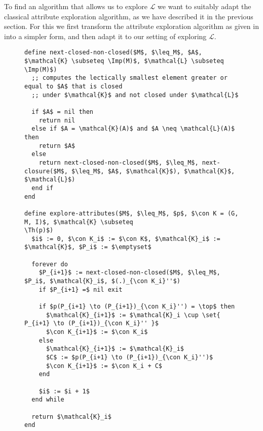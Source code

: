 To find an algorithm that allows us to explore $\mathcal{L}$ we want to suitably adapt the
classical attribute exploration algorithm, as we have described it in the previous
section.  For this we first transform the attribute exploration algorithm as given in
 into a simpler form, and then adapt it to our setting of
exploring $\mathcal{L}$.


\begin{figure}[tp]
  \begin{Algorithm}
  \label{alg:explore-attributes-with-next-closed-none-closed}
  \hspace*{0cm}
\begin{lstlisting}
define next-closed-non-closed($M$, $\leq_M$, $A$, $\mathcal{K} \subseteq \Imp(M)$, $\mathcal{L} \subseteq \Imp(M)$)
  ;; computes the lectically smallest element greater or equal to $A$ that is closed
  ;; under $\mathcal{K}$ and not closed under $\mathcal{L}$

  if $A$ = nil then
    return nil
  else if $A = \mathcal{K}(A)$ and $A \neq \mathcal{L}(A)$ then
    return $A$
  else
    return next-closed-non-closed($M$, $\leq_M$, next-closure($M$, $\leq_M$, $A$, $\mathcal{K}$), $\mathcal{K}$, $\mathcal{L}$)
  end if
end

define explore-attributes($M$, $\leq_M$, $p$, $\con K = (G, M, I)$, $\mathcal{K} \subseteq
\Th(p)$)
  $i$ := 0, $\con K_i$ := $\con K$, $\mathcal{K}_i$ := $\mathcal{K}$, $P_i$ := $\emptyset$

  forever do
    $P_{i+1}$ := next-closed-non-closed($M$, $\leq_M$, $P_i$, $\mathcal{K}_i$, $(.)_{\con K_i}''$)
    if $P_{i+1} =$ nil exit

    if $p(P_{i+1} \to (P_{i+1})_{\con K_i}'') = \top$ then
      $\mathcal{K}_{i+1}$ := $\mathcal{K}_i \cup \set{ P_{i+1} \to (P_{i+1})_{\con K_i}'' }$
      $\con K_{i+1}$ := $\con K_i$
    else
      $\mathcal{K}_{i+1}$ := $\mathcal{K}_i$
      $C$ := $p(P_{i+1} \to (P_{i+1})_{\con K_i}'')$
      $\con K_{i+1}$ := $\con K_i + C$
    end

    $i$ := $i + 1$
  end while

  return $\mathcal{K}_i$  
end
\end{lstlisting}
  \end{Algorithm}
\end{figure}

